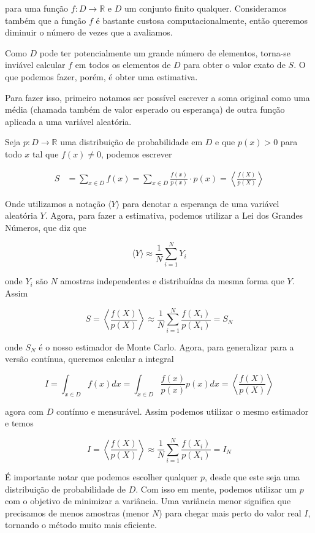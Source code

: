 para uma função $f: D \rightarrow \mathbb{R}$ e $D$ um conjunto finito
qualquer. Consideramos também que a função $f$ é bastante custosa
computacionalmente, então queremos diminuir o número de vezes que a avaliamos. 

Como $D$ pode ter potencialmente um grande número de elementos, torna-se
inviável calcular $f$ em todos os elementos de $D$ para obter o valor exato de
$S$. O que podemos fazer, porém, é obter uma estimativa.

Para fazer isso, primeiro notamos ser possível escrever a soma original como
uma média (chamada também de valor esperado ou esperança) de outra função
aplicada a uma variável aleatória.

Seja $p: D \rightarrow \mathbb{R}$ uma distribuição de probabilidade em $D$ e
que $p(x) > 0$ para todo $x$ tal que $f(x) \not = 0$, podemos escrever

\begin{align*}
  S &= \sum_{x \in D} f(x) = \sum_{x \in D} \frac{f(x)}{p(x)} \cdot p(x) =
  \left\langle \frac{f(X)}{p(X)} \right\rangle
\end{align*}

Onde utilizamos a notação $\langle Y \rangle$ para denotar a esperança de uma
variável aleatória $Y$. Agora, para fazer a estimativa, podemos utilizar a Lei dos
Grandes Números, que diz que

\[ \langle Y \rangle \approx \frac{1}{N} \sum_{i=1}^N Y_i \]

onde $Y_i$ são $N$ amostras independentes e distribuídas da mesma forma que
$Y$. Assim

\[ S = \left\langle \frac{f(X)}{p(X)} \right\rangle \approx \frac{1}{N}
\sum_{i=1}^N \frac{f(X_i)}{p(X_i)} = S_N \]

onde $S_N$ é o nosso estimador de Monte Carlo. Agora, para generalizar para a
versão contínua, queremos calcular a integral

\[ I = \int_{x \in D} f(x) dx = \int_{x \in D} \frac{f(x)}{p(x)} p(x) dx =
\left\langle \frac{f(X)}{p(X)} \right\rangle \]

agora com $D$ contínuo e mensurável. Assim podemos utilizar o mesmo estimador e
temos

\[ I = \left\langle \frac{f(X)}{p(X)} \right\rangle \approx \frac{1}{N}
\sum_{i=1}^N \frac{f(X_i)}{p(X_i)} = I_N \]

É importante notar que podemos escolher qualquer $p$, desde que este seja uma
distribuição de probabilidade de $D$. Com isso em mente, podemos utilizar um
$p$ com o objetivo de minimizar a variância. Uma variância menor significa que
precisamos de menos amostras (menor $N$) para chegar mais perto do valor real
$I$, tornando o método muito mais eficiente.

